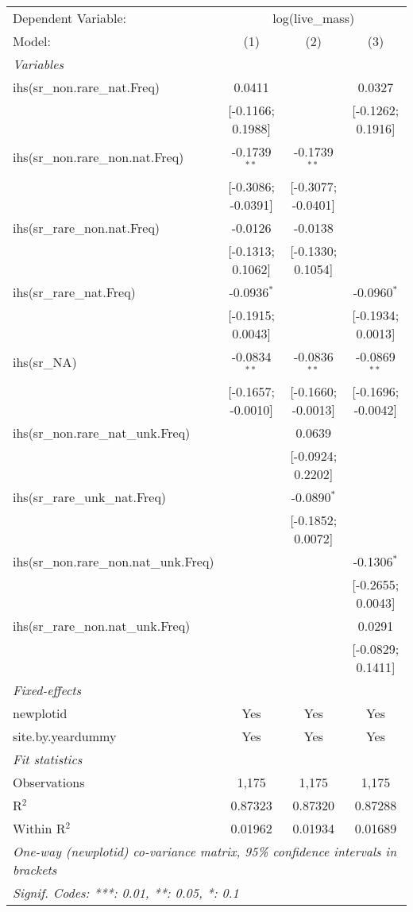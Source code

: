 \begin{tabular}{lccc}
\tabularnewline\midrule\midrule
Dependent Variable:&\multicolumn{3}{c}{log(live\_mass)}\\
Model:&(1) & (2) & (3)\\
\midrule \emph{Variables}&   &   &  \\
ihs(sr\_non.rare\_nat.Freq)&0.0411 &    & 0.0327\\
  &[-0.1166; 0.1988] &    & [-0.1262; 0.1916]\\
ihs(sr\_non.rare\_non.nat.Freq)&-0.1739$^{**}$ & -0.1739$^{**}$ &   \\
  &[-0.3086; -0.0391] & [-0.3077; -0.0401] &   \\
ihs(sr\_rare\_non.nat.Freq)&-0.0126 & -0.0138 &   \\
  &[-0.1313; 0.1062] & [-0.1330; 0.1054] &   \\
ihs(sr\_rare\_nat.Freq)&-0.0936$^{*}$ &    & -0.0960$^{*}$\\
  &[-0.1915; 0.0043] &    & [-0.1934; 0.0013]\\
ihs(sr\_NA)&-0.0834$^{**}$ & -0.0836$^{**}$ & -0.0869$^{**}$\\
  &[-0.1657; -0.0010] & [-0.1660; -0.0013] & [-0.1696; -0.0042]\\
ihs(sr\_non.rare\_nat\_unk.Freq)&   & 0.0639 &   \\
  &   & [-0.0924; 0.2202] &   \\
ihs(sr\_rare\_unk\_nat.Freq)&   & -0.0890$^{*}$ &   \\
  &   & [-0.1852; 0.0072] &   \\
ihs(sr\_non.rare\_non.nat\_unk.Freq)&   &    & -0.1306$^{*}$\\
  &   &    & [-0.2655; 0.0043]\\
ihs(sr\_rare\_non.nat\_unk.Freq)&   &    & 0.0291\\
  &   &    & [-0.0829; 0.1411]\\
\midrule \emph{Fixed-effects}&   &   &  \\
newplotid & Yes & Yes & Yes\\
site.by.yeardummy & Yes & Yes & Yes\\
\midrule \emph{Fit statistics}&  & & \\
Observations & 1,175&1,175&1,175\\
R$^2$ & 0.87323&0.87320&0.87288\\
Within R$^2$ & 0.01962&0.01934&0.01689\\
\midrule\midrule\multicolumn{4}{l}{\emph{One-way (newplotid) co-variance matrix, 95\% confidence intervals in brackets}}\\
\multicolumn{4}{l}{\emph{Signif. Codes: ***: 0.01, **: 0.05, *: 0.1}}\\
\end{tabular}


